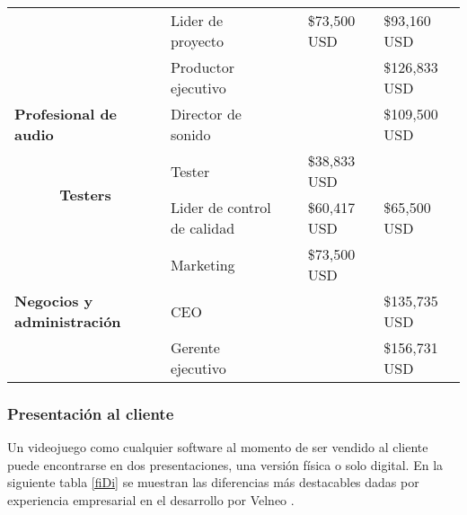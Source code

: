 \begin{table}[htbp]
{\begin{tabular}{|l|l|l|l|l|}
		\multicolumn{1}{|c|}{}                                               & Lider de proyecto           &                                     & \$73,500 USD                         & \$93,160 USD                        \\ \cline{2-5} 
		\multicolumn{1}{|c|}{}                                               & Productor ejecutivo         &                                     &                                      & \$126,833 USD                       \\ \hline
		\textbf{Profesional de audio}                                        & Director de sonido          &                                     &                                      & \$109,500 USD                       \\ \hline
		\multicolumn{1}{|c|}{\multirow{2}{*}{\textbf{Testers}}}              & Tester                      &                                     & \$38,833 USD                         &                                     \\ \cline{2-5} 
		\multicolumn{1}{|c|}{}                                               & Lider de control de calidad &                                     & \$60,417 USD                         & \$65,500 USD                        \\ \hline
		\multirow{3}{*}{\textbf{Negocios y administración}}                  & Marketing                   &                                     & \$73,500 USD                         &                                     \\ \cline{2-5} 
		& CEO                         &                                     &                                      & \$135,735 USD                       \\ \cline{2-5} 
		& Gerente ejecutivo           &                                     &                                      & \$156,731 USD                       \\ \hline
	\end{tabular}
}
\end{table}

\subsubsection{Presentación al cliente}
Un videojuego como cualquier software al momento de ser vendido al cliente puede encontrarse en dos presentaciones, una versión física o solo digital. En la siguiente tabla \ref{fiDi} se muestran las diferencias más destacables dadas por experiencia empresarial en el desarrollo por Velneo \cite{velneo2015}.

